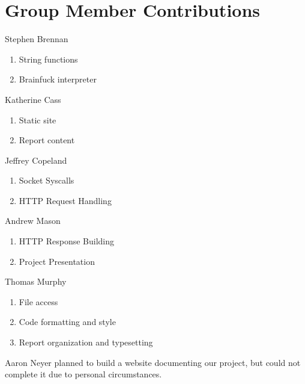 \documentclass[journal,10pt]{IEEEtran}
\begin{document}
\section{Group Member Contributions}

\begin{LaTeXitemize} \itemsep0pt \parskip0pt
  \item Stephen Brennan
  \begin{enumerate}
    \item String functions
    \item Brainfuck interpreter
  \end{enumerate}

  \item Katherine Cass
  \begin{enumerate}
    \item Static site
    \item Report content
  \end{enumerate}

  \item Jeffrey Copeland
  \begin{enumerate}
    \item Socket Syscalls
    \item HTTP Request Handling
  \end{enumerate}

  \item Andrew Mason
  \begin{enumerate}
    \item HTTP Response Building
    \item Project Presentation
  \end{enumerate}

  \item Thomas Murphy
  \begin{enumerate}
    \item File access
    \item Code formatting and style
    \item Report organization and typesetting
  \end{enumerate}

\end{LaTeXitemize}

Aaron Neyer planned to build a website documenting our project, but could not
complete it due to personal circumstances.
\end{document}
